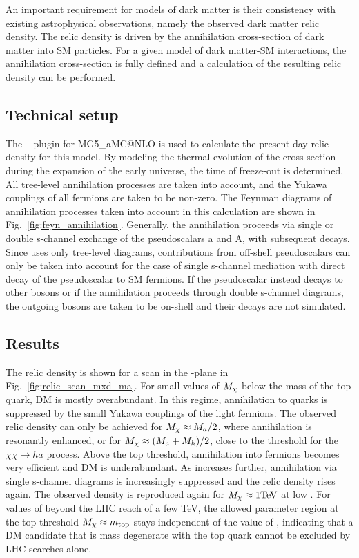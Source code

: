 \newcommand{\mgamcnlo}{MG5\_aMC@NLO\xspace}
\newcommand{\A}{A}

An important requirement for models of dark matter is their consistency with existing astrophysical observations, namely the observed dark matter relic density.
The relic density is driven by the annihilation cross-section of dark matter into SM particles.
For a given model of dark matter-SM interactions, the annihilation cross-section is fully defined and a calculation of the resulting relic density can be performed. 

\subsection{Technical setup}
The \maddm~\cite{Backovic:2013dpa,Backovic:2015cra} plugin for \mgamcnlo is used to calculate the present-day relic density for this model.
By modeling the thermal evolution of the cross-section during the expansion of the early universe, the time of freeze-out is determined.
All tree-level annihilation processes are taken into account, and the Yukawa couplings of all fermions are taken to be non-zero.
The Feynman diagrams of annihilation processes taken into account in this calculation are shown in Fig.~\ref{fig:feyn_annihilation}. Generally, the annihilation proceeds via single or double s-channel exchange of the pseudoscalars a and A, with subsequent decays. Since \maddm uses only tree-level diagrams, contributions from off-shell pseudoscalars can only be taken into account for the case of single s-channel mediation with direct decay of the pseudoscalar to SM fermions. If the pseudoscalar instead decays to other bosons or if the annihilation proceeds through double s-channel diagrams, the outgoing bosons are taken to be on-shell and their decays are not simulated. 

\subsection{Results}
The relic density is shown for a scan in the \ma-\mDM plane in Fig.~\ref{fig:relic_scan_mxd_ma}.
For small values of $M_{\chi}$ below the mass of the top quark, DM is mostly overabundant. In this regime, annihilation to quarks is suppressed by the small Yukawa couplings of the light fermions. The observed relic density can only be achieved for $M_{\chi}\approx M_{a}/2$, where annihilation is resonantly enhanced, or for $M_{\chi} \approx (M_{a}+M_{h})/2$, close to the threshold for the $\chi\chi\rightarrow h a$ process.
Above the top threshold, annihilation into fermions becomes very efficient and DM is underabundant. As \mDM increases further, annihilation via single s-channel diagrams is increasingly suppressed and the relic density rises again. The observed density is reproduced again for $M_{\chi}\approx1 \mathrm{TeV}$ at low \ma.
For values of \ma beyond the LHC reach of a few TeV, the allowed parameter region at the top threshold $M_{\chi}\approx m_{\mathrm{top}}$ stays independent of the value of \ma, indicating that a DM candidate that is mass degenerate with the top quark cannot be excluded by LHC searches alone.

